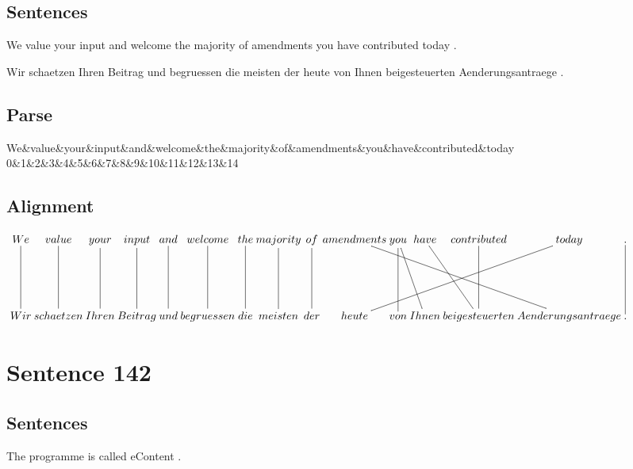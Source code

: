 \documentclass{report}
\begin{document}
\subsection*{Sentences}
We value your input and welcome the majority of amendments you have contributed today .

\noindent Wir schaetzen Ihren Beitrag und begruessen die meisten der heute von Ihnen beigesteuerten Aenderungsantraege .



\subsection*{Parse}
\begin{dependency}[theme=simple]
\begin{deptext}[column sep=.5cm, row sep=.1ex]
We\&value\&your\&input\&and\&welcome\&the\&majority\&of\&amendments\&you\&have\&contributed\&today\\
0\&1\&2\&3\&4\&5\&6\&7\&8\&9\&10\&11\&12\&13\&14\\
\end{deptext}
\end{dependency}


\subsection*{Alignment}
\scriptsize{
$
\xymatrix@C-2.3pc{
We \ar @{-} [dd] & value \ar @{-} [dd] & your \ar @{-} [dd] & input \ar @{-} [dd] & and \ar @{-} [dd] & welcome \ar @{-} [dd] & the \ar @{-} [dd] & majority \ar @{-} [dd] & of \ar @{-} [dd] & amendments \ar @{-} [ddrrrr] & you \ar @{-} [ddr] \ar @{-} [dd] & have \ar @{-} [ddr] & contributed \ar @{-} [dd] & today \ar @{-} [ddllll] & . \ar @{-} [dd]\\\\
Wir & schaetzen & Ihren & Beitrag & und & begruessen & die & meisten & der & heute & von & Ihnen & beigesteuerten & Aenderungsantraege & .
}$}
\newpage\section*{Sentence 142}

\subsection*{Sentences}
The programme is called eContent .
\end{document}
